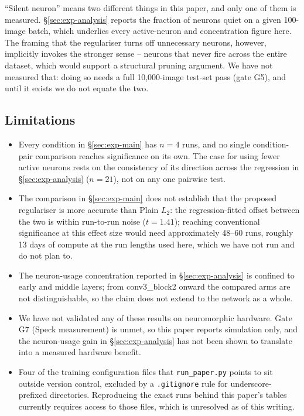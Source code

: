 ``Silent neuron'' means two different things in this paper, and only one of
them is measured. \S\ref{sec:exp-analysis} reports the fraction of neurons
quiet on a given 100-image batch, which underlies every active-neuron and
concentration figure here. The framing that the regulariser turns off
unnecessary neurons, however, implicitly invokes the stronger sense --
neurons that never fire across the entire dataset, which would support a
structural pruning argument. We have not measured that: doing so needs a
full 10,000-image test-set pass (gate G5), and until it exists we do not
equate the two.

\subsection{Limitations}
\label{sec:limitations}

\begin{itemize}\itemsep0pt
  \item Every condition in \S\ref{sec:exp-main} has $n=4$ runs, and no single
  condition-pair comparison reaches significance on its own. The case for
  using fewer active neurons rests on the consistency of its direction across
  the regression in \S\ref{sec:exp-analysis} ($n=21$), not on any one
  pairwise test.
  \item The comparison in \S\ref{sec:exp-main} does not establish that the
  proposed regulariser is more accurate than Plain $L_2$: the
  regression-fitted offset between the two is within run-to-run noise
  ($t=1.41$); reaching conventional significance at this effect size would
  need approximately 48--60 runs, roughly 13 days of compute at the run
  lengths used here, which we have not run and do not plan to.
  \item The neuron-usage concentration reported in \S\ref{sec:exp-analysis}
  is confined to early and middle layers; from conv3\_block2 onward the
  compared arms are not distinguishable, so the claim does not extend to the
  network as a whole.
  \item We have not validated any of these results on neuromorphic hardware.
  Gate G7 (Speck measurement) is unmet, so this paper reports simulation
  only, and the neuron-usage gain in \S\ref{sec:exp-analysis} has not been
  shown to translate into a measured hardware benefit.
  \item Four of the training configuration files that \texttt{run\_paper.py}
  points to sit outside version control, excluded by a \texttt{.gitignore}
  rule for underscore-prefixed directories. Reproducing the exact runs
  behind this paper's tables currently requires access to those files,
  which is unresolved as of this writing.
\end{itemize}
